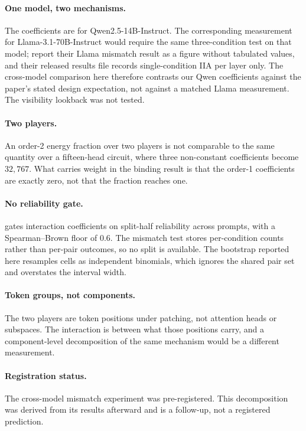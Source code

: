 \documentclass{article}
\begin{document}
\paragraph{One model, two mechanisms.}
The coefficients are for Qwen2.5-14B-Instruct. The corresponding measurement for Llama-3.1-70B-Instruct would require the same three-condition test on that model; \citet{prakash2025lookback} report their Llama mismatch result as a figure without tabulated values, and their released results file records single-condition IIA per layer only. The cross-model comparison here therefore contrasts our Qwen coefficients against the paper's stated design expectation, not against a matched Llama measurement. The visibility lookback was not tested.

\paragraph{Two players.}
An order-2 energy fraction over two players is not comparable to the same quantity over a fifteen-head circuit, where three non-constant coefficients become $32{,}767$. What carries weight in the binding result is that the order-1 coefficients are exactly zero, not that the fraction reaches one.

\paragraph{No reliability gate.}
\citet{tower2026epistatic} gates interaction coefficients on split-half reliability across prompts, with a Spearman--Brown floor of $0.6$. The mismatch test stores per-condition counts rather than per-pair outcomes, so no split is available. The bootstrap reported here resamples cells as independent binomials, which ignores the shared pair set and overstates the interval width.

\paragraph{Token groups, not components.}
The two players are token positions under patching, not attention heads or subspaces. The interaction is between what those positions carry, and a component-level decomposition of the same mechanism would be a different measurement.

\paragraph{Registration status.}
The cross-model mismatch experiment was pre-registered. This decomposition was derived from its results afterward and is a follow-up, not a registered prediction.
\end{document}
